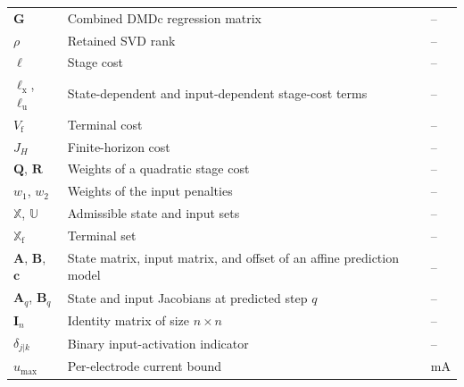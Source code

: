 \begin{tabular}{lll}
    $\mathbf{G}$ & Combined DMDc regression matrix & -- \\
    $\rho$ & Retained SVD rank & -- \\
    $\ell$ & Stage cost & -- \\
    $\ell_\mathrm{x}$, $\ell_\mathrm{u}$ & State-dependent and input-dependent stage-cost terms & -- \\
    $V_\mathrm{f}$ & Terminal cost & -- \\
    $J_H$ & Finite-horizon cost & -- \\
    $\mathbf{Q}$, $\mathbf{R}$ & Weights of a quadratic stage cost & -- \\
    $w_1$, $w_2$ & Weights of the input penalties & -- \\
    $\mathbb{X}$, $\mathbb{U}$ & Admissible state and input sets & -- \\
    $\mathbb{X}_\mathrm{f}$ & Terminal set & -- \\
    $\mathbf{A}$, $\mathbf{B}$, $\mathbf{c}$ & State matrix, input matrix, and offset of an affine prediction model & -- \\
    $\mathbf{A}_q$, $\mathbf{B}_q$ & State and input Jacobians at predicted step $q$ & -- \\
    $\mathbf{I}_n$ & Identity matrix of size $n \times n$ & -- \\
    $\delta_{j|k}$ & Binary input-activation indicator & -- \\
    $u_\mathrm{max}$ & Per-electrode current bound & \si{\milli\ampere} \\
    \bottomrule
\end{tabular}

